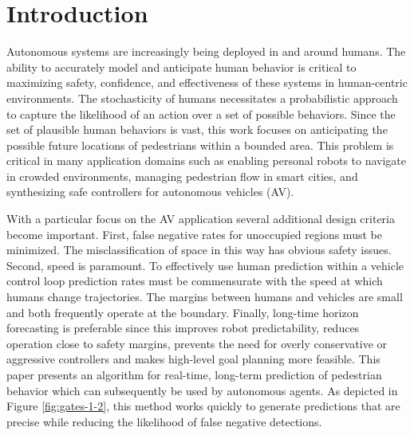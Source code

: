 \documentclass[letterpaper,10pt,conference]{ieeeconf}
\begin{document}

\section{Introduction}

Autonomous systems are increasingly being deployed in and around humans. 
The ability to accurately model and anticipate human behavior is critical to maximizing safety, confidence, and effectiveness of these systems in human-centric environments. 
The stochasticity of humans necessitates a probabilistic approach to capture the likelihood of an action over a set of possible behaviors. 
Since the set of plausible human behaviors is vast, this work focuses on anticipating the possible future locations of pedestrians within a bounded area. 
This problem is critical in many application domains such as enabling personal robots to navigate in crowded environments, managing pedestrian flow in smart cities, and synthesizing safe controllers for autonomous vehicles (AV).  

With a particular focus on the AV application several additional design criteria become important. 
First, false negative rates for unoccupied regions must be minimized. 
The misclassification of space in this way has obvious safety issues. 
Second, speed is paramount. 
To effectively use human prediction within a vehicle control loop prediction rates must be commensurate with the speed at which humans change trajectories. 
The margins between humans and vehicles are small and both frequently operate at the boundary. 
Finally, long-time horizon forecasting is preferable since this improves robot predictability, reduces operation close to safety margins, prevents the need for overly conservative or aggressive controllers and makes high-level goal planning more feasible.
This paper presents an algorithm for real-time, long-term prediction of pedestrian behavior which can subsequently be used by autonomous agents.
As depicted in Figure \ref{fig:gates-1-2}, this method works quickly to generate predictions that are precise while reducing the likelihood of false negative detections. 
\end{document}
